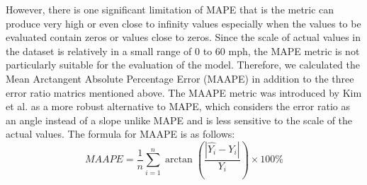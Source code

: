 \documentclass[11pt]{uonthesis}
\begin{document}
However, there is one significant limitation of MAPE that is the metric can produce very high or even close to infinity values especially when the values to be evaluated contain zeros or values close to zeros. Since the scale of actual values in the dataset is relatively in a small range of 0 to 60 mph, the MAPE metric is not particularly suitable for the evaluation of the model. Therefore, we calculated the Mean Arctangent Absolute Percentage Error (MAAPE) in addition to the three error ratio matrics mentioned above. The MAAPE metric was introduced by Kim et al.\cite{KIM2016669} as a more robust alternative to MAPE, which considers the error ratio as an angle instead of a slope unlike MAPE and is less sensitive to the scale of the actual values. The formula for MAAPE is as follows:
\[ MAAPE = \frac{1}{n}\sum_{i=1}^{n} \arctan\left(\frac{|\hat{Y_i} - Y_i|}{Y_i}\right) \times 100\% \]

\end{document}
